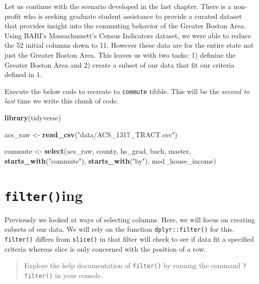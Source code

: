 \documentclass[
]{book}
\newenvironment{Shaded}{\begin{snugshade}}{\end{snugshade}}
\newcommand{\KeywordTok}[1]{\textcolor[rgb]{0.13,0.29,0.53}{\textbf{#1}}}
\newcommand{\NormalTok}[1]{#1}
\newcommand{\StringTok}[1]{\textcolor[rgb]{0.31,0.60,0.02}{#1}}
\begin{document}
Let us continue with the scenario developed in the last chapter. There is a non-profit who is seeking graduate student assistance to provide a curated dataset that provides insight into the commuting behavior of the Greater Boston Area. Using BARI's Massachussett's Census Indicators dataset, we were able to reduce the 52 initial columns down to 11. However these data are for the entire state not just the Greater Boston Area. This leaves us with two tasks: 1) definine the Greater Boston Area and 2) create a subset of our data that fit our criteria defined in 1.

Execute the below code to recreate to \texttt{commute} tibble. This will be the \emph{second to last} time we write this chunk of code.

\begin{Shaded}
\begin{Highlighting}[]
\KeywordTok{library}\NormalTok{(tidyverse)}

\NormalTok{acs\_raw \textless{}{-}}\StringTok{ }\KeywordTok{read\_csv}\NormalTok{(}\StringTok{"data/ACS\_1317\_TRACT.csv"}\NormalTok{)}

\NormalTok{commute \textless{}{-}}\StringTok{ }\KeywordTok{select}\NormalTok{(acs\_raw,}
\NormalTok{                  county,}
\NormalTok{                  hs\_grad, bach, master,}
                  \KeywordTok{starts\_with}\NormalTok{(}\StringTok{"commute"}\NormalTok{),}
                  \KeywordTok{starts\_with}\NormalTok{(}\StringTok{"by"}\NormalTok{),}
\NormalTok{                  med\_house\_income)}
\end{Highlighting}
\end{Shaded}

\hypertarget{filtering}{%
\section{\texorpdfstring{\texttt{filter()}ing}{filter()ing}}\label{filtering}}

Previously we looked at ways of selecting columns. Here, we will focus on creating subsets of our data. We will rely on the function \texttt{dplyr::filter()} for this. \texttt{filter()} differs from \texttt{slice()} in that filter will check to see if data fit a specified criteria whereas slice is only concerned with the position of a row.

\begin{quote}
Explore the help documentation of \texttt{filter()} by running the command \texttt{?filter()} in your console.
\end{quote}
\end{document}
